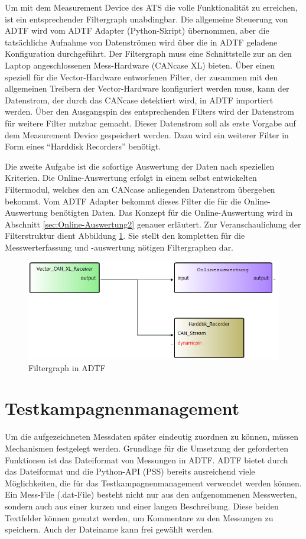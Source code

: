 \documentclass[12pt,a4paper]{report}
\begin{document}
Um mit dem Measurement Device des ATS die volle Funktionalität zu erreichen, ist ein entsprechender Filtergraph unabdingbar. Die allgemeine Steuerung von ADTF wird vom ADTF Adapter (Python-Skript) übernommen, aber die tatsächliche Aufnahme von Datenströmen wird über die in ADTF geladene Konfiguration durchgeführt. Der Filtergraph muss eine Schnittstelle zur an den Laptop angeschlossenen Mess-Hardware (CANcase XL) bieten. Über einen speziell für die Vector-Hardware entworfenen Filter, der zusammen mit den allgemeinen Treibern der Vector-Hardware konfiguriert werden muss, kann der Datenstrom, der durch das CANcase detektiert wird, in ADTF importiert werden. Über den Ausgangspin des entsprechenden Filters wird der Datenstrom für weitere Filter nutzbar gemacht. Dieser Datenstrom soll als erste Vorgabe auf dem Measurement Device gespeichert werden. Dazu wird ein weiterer Filter in Form eines "`Harddisk Recorders"' benötigt.

Die zweite Aufgabe ist die sofortige Auswertung der Daten nach speziellen Kriterien. Die Online-Auswertung erfolgt in einem selbst entwickelten Filtermodul, welches den am CANcase anliegenden Datenstrom übergeben bekommt. Vom ADTF Adapter bekommt dieses Filter die für die Online-Auswertung benötigten Daten. Das Konzept für die Online-Auswertung wird in Abschnitt \ref{sec:Online-Auswertung2} genauer erläutert. Zur Veranschaulichung der Filterstruktur dient Abbildung \ref{pic:Filtergraph in ADTF}. Sie stellt den kompletten für die Messwerterfassung und -auswertung nötigen Filtergraphen dar.
\begin{figure}
\includegraphics[width=1\linewidth]{Darstellungen/Filtergraph}
\caption{Filtergraph in ADTF}\label{pic:Filtergraph in ADTF}
\end{figure}
\section{Testkampagnenmanagement}\label{sec:Testkampagnenmanagement2}
Um die aufgezeichneten Messdaten später eindeutig zuordnen zu können, müssen Mechanismen festgelegt werden. Grundlage für die Umsetzung der geforderten Funktionen ist das Dateiformat von Messungen in ADTF. ADTF bietet durch das Dateiformat und die Python-API (PSS) bereits ausreichend viele Möglichkeiten, die für das Testkampagnenmanagement verwendet werden können. Ein Mess-File (.dat-File) besteht nicht nur aus den aufgenommenen Messwerten, sondern auch aus einer kurzen und einer langen Beschreibung. Diese beiden Textfelder können genutzt werden, um Kommentare zu den Messungen zu speichern. Auch der Dateiname kann frei gewählt werden.
\end{document}
